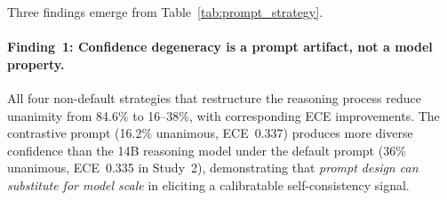 \begin{table}[t]
\centering
\caption{Study~4 prompt-strategy comparison on Gemini 2.5 Flash Lite (247 Juliet alerts, $k_{\mathrm{sc}}=5$, $F{=}5$, $\alpha_{\mathrm{conf}}{=}0.1$). ``No~cal.'' columns are raw LLM output; ``cal.'' columns include conformal singleton-reject. $\Delta$P is precision change vs.\ default (no cal.).}
\label{tab:prompt_strategy}
\small
\setlength{\tabcolsep}{3pt}
\end{table}

Three findings emerge from Table~\ref{tab:prompt_strategy}.

\paragraph{Finding~1: Confidence degeneracy is a prompt artifact, not a model property.}
All four non-default strategies that restructure the reasoning process reduce unanimity from 84.6\% to 16--38\%, with corresponding ECE improvements. The contrastive prompt (16.2\% unanimous, ECE~0.337) produces more diverse confidence than the 14B reasoning model under the default prompt (36\% unanimous, ECE~0.335 in Study~2), demonstrating that \emph{prompt design can substitute for model scale} in eliciting a calibratable self-consistency signal.


